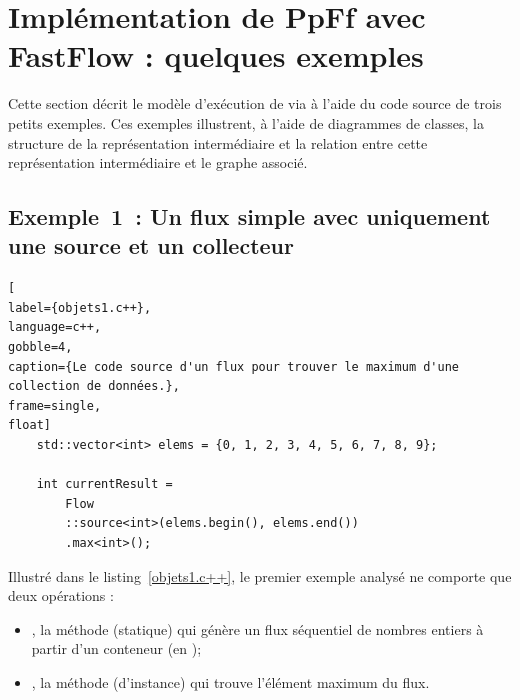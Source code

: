 \section{Impl\'ementation de {PpFf} avec {FastFlow} : quelques exemples}

Cette section d\'ecrit le mod\`ele d'ex\'ecution de  via  \`a l'aide du code source de trois petits exemples. Ces exemples illustrent, \`a l'aide de diagrammes de classes, la structure de la représentation intermédiaire et la relation entre cette représentation intermédiaire et le graphe  associé.


\subsection{Exemple~1~: Un flux simple avec uniquement une source et un collecteur} 


\begin{lstlisting}[
label={objets1.c++},
language=c++,
gobble=4,
caption={Le code source d'un flux pour trouver le maximum d'une collection de données.},
frame=single,
float]
    std::vector<int> elems = {0, 1, 2, 3, 4, 5, 6, 7, 8, 9};

    int currentResult =
        Flow
        ::source<int>(elems.begin(), elems.end())
        .max<int>();
\end{lstlisting}

Illustr\'e dans le listing~\ref{objets1.c++}, le premier exemple analys\'e ne comporte que deux op\'erations :

\begin{itemize}
\item {}, la méthode (statique) qui g\'en\`ere un flux s\'equentiel de nombres entiers \`a partir d'un conteneur (en ); 
\item {}, la méthode (d'instance) qui trouve l'\'el\'ement maximum du flux. 


\end{itemize}



